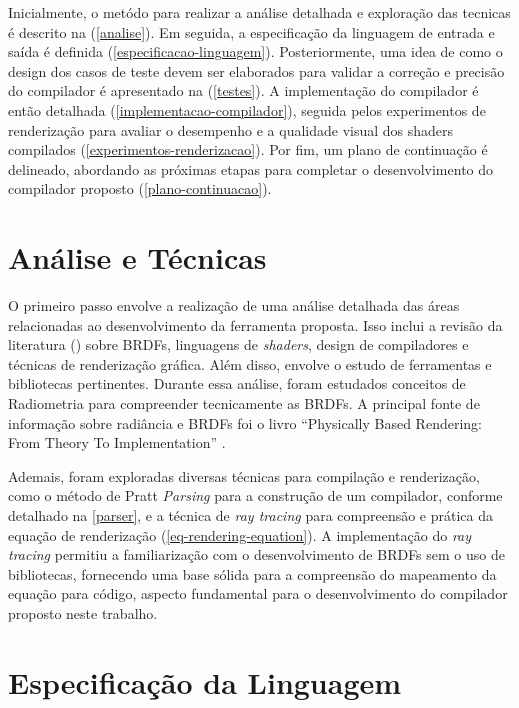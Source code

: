 \documentclass[english, 
               brazil, 
               bsc] %
               {dcomp-abntex2}
\begin{document}
Inicialmente, o metódo para realizar a análise detalhada e exploração das tecnicas é descrito na (\autoref{analise}). Em seguida, a especificação da linguagem de entrada e saída é definida (\autoref{especificacao-linguagem}). Posteriormente, uma idea de como o design dos casos de teste devem ser elaborados para validar a correção e precisão do compilador é apresentado na (\autoref{testes}). A implementação do compilador é então detalhada (\autoref{implementacao-compilador}), seguida pelos experimentos de renderização para avaliar o desempenho e a qualidade visual dos shaders compilados (\autoref{experimentos-renderizacao}). Por fim, um plano de continuação é delineado, abordando as próximas etapas para completar o desenvolvimento do compilador proposto (\autoref{plano-continuacao}).

\section{Análise e Técnicas} \label{analise}


O primeiro passo envolve a realização de uma análise detalhada das áreas relacionadas ao desenvolvimento da ferramenta proposta. Isso inclui a revisão da literatura (\cite{revisao}) sobre BRDFs, linguagens de \textit{shaders}, design de compiladores e técnicas de renderização gráfica. Além disso, envolve o estudo de ferramentas e bibliotecas pertinentes. Durante essa análise, foram estudados conceitos de Radiometria para compreender tecnicamente as BRDFs. A principal fonte de informação sobre radiância e BRDFs foi o livro ``Physically Based Rendering: From Theory To Implementation'' \cite{pbr}.

Ademais, foram exploradas diversas técnicas para compilação e renderização, como o método de Pratt \textit{Parsing} para a construção de um compilador, conforme detalhado na \ref{parser}, e a técnica de \textit{ray tracing} para compreensão e prática da equação de renderização (\autoref{eq-rendering-equation}). A implementação do \textit{ray tracing} permitiu a familiarização com o desenvolvimento de BRDFs sem o uso de bibliotecas, fornecendo uma base sólida para a compreensão do mapeamento da equação para código, aspecto fundamental para o desenvolvimento do compilador proposto neste trabalho.

\section{Especificação da Linguagem}\label{especificacao-linguagem}
\end{document}
